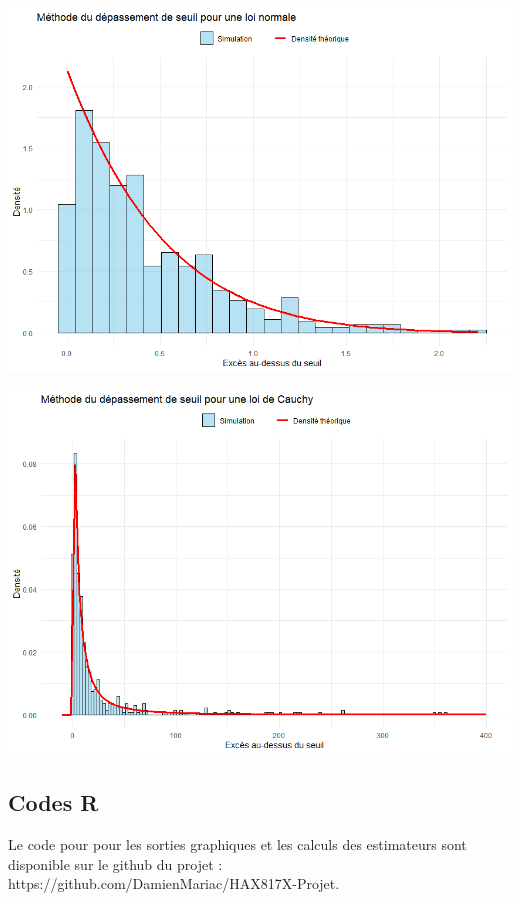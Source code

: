 \documentclass{article}
\theoremstyle{plain}
\theoremstyle{definition}
\theoremstyle{plain}
\begin{document}
\begin{center}
	\includegraphics[scale=0.70]{./images/DS_Normale} 
\end{center}

\begin{center}
	\includegraphics[scale=0.70]{./images/DS_Cauchy} 
\end{center}

\subsection{Codes R}

\noindent Le code pour pour les sorties graphiques et les calculs des estimateurs sont disponible sur le github du projet : https://github.com/DamienMariac/HAX817X-Projet.
\end{document}
